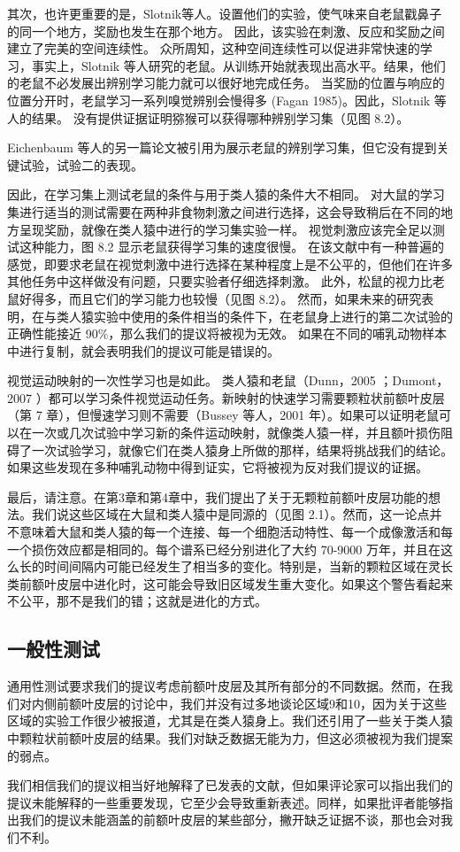其次，也许更重要的是，Slotnik等人。设置他们的实验，使气味来自老鼠戳鼻子的同一个地方，奖励也发生在那个地方。
因此，该实验在刺激、反应和奖励之间建立了完美的空间连续性。
众所周知，这种空间连续性可以促进非常快速的学习\cite{cowey1968varying}，事实上，Slotnik 等人研究的老鼠。从训练开始就表现出高水平。结果，他们的老鼠不必发展出辨别学习能力就可以很好地完成任务。
当奖励的位置与响应的位置分开时，老鼠学习一系列嗅觉辨别会慢得多 (Fagan 1985)。因此，Slotnik 等人的结果。
没有提供证据证明猕猴可以获得哪种辨别学习集（见图 8.2）。
\par


Eichenbaum 等人的另一篇论文\cite{eichenbaum1986normal}被引用为展示老鼠的辨别学习集，但它没有提到关键试验，试验二的表现。
\par


因此，在学习集上测试老鼠的条件与用于类人猿的条件大不相同。
对大鼠的学习集进行适当的测试需要在两种非食物刺激之间进行选择，这会导致稍后在不同的地方呈现奖励，就像在类人猿中进行的学习集实验一样。
视觉刺激应该完全足以测试这种能力，图 8.2 显示老鼠获得学习集的速度很慢。
在该文献中有一种普遍的感觉，即要求老鼠在视觉刺激中进行选择在某种程度上是不公平的，但他们在许多其他任务中这样做没有问题，只要实验者仔细选择刺激\cite{bussey2008touchscreen}。
此外，松鼠的视力比老鼠好得多，而且它们的学习能力也较慢（见图 8.2）。
然而，如果未来的研究表明，在与类人猿实验中使用的条件相当的条件下，在老鼠身上进行的第二次试验的正确性能接近 90$\%$，那么我们的提议将被视为无效。
如果在不同的哺乳动物样本中进行复制，就会表明我们的提议可能是错误的。
\par


视觉运动映射的一次性学习也是如此。
类人猿和老鼠（Dunn，2005 ；Dumont，2007 ）都可以学习条件视觉运动任务。新映射的快速学习需要颗粒状前额叶皮层（第 7 章），但慢速学习则不需要（Bussey 等人，2001 年）。如果可以证明老鼠可以在一次或几次试验中学习新的条件运动映射，就像类人猿一样，并且额叶损伤阻碍了一次试验学习，就像它们在类人猿身上所做的那样，结果将挑战我们的结论。如果这些发现在多种哺乳动物中得到证实，它将被视为反对我们提议的证据。
\par 
最后，请注意。在第3章和第4章中，我们提出了关于无颗粒前额叶皮层功能的想法。我们说这些区域在大鼠和类人猿中是同源的（见图 2.1）。然而，这一论点并不意味着大鼠和类人猿的每一个连接、每一个细胞活动特性、每一个成像激活和每一个损伤效应都是相同的。每个谱系已经分别进化了大约 70-9000 万年，并且在这么长的时间间隔内可能已经发生了相当多的变化。特别是，当新的颗粒区域在灵长类前额叶皮层中进化时，这可能会导致旧区域发生重大变化。如果这个警告看起来不公平，那不是我们的错；这就是进化的方式。
\subsection{一般性测试}
通用性测试要求我们的提议考虑前额叶皮层及其所有部分的不同数据。然而，在我们对内侧前额叶皮层的讨论中，我们并没有过多地谈论区域9和10，因为关于这些区域的实验工作很少被报道，尤其是在类人猿身上。我们还引用了一些关于类人猿中颗粒状前额叶皮层的结果。我们对缺乏数据无能为力，但这必须被视为我们提案的弱点。
\par 
我们相信我们的提议相当好地解释了已发表的文献，但如果评论家可以指出我们的提议未能解释的一些重要发现，它至少会导致重新表述。同样，如果批评者能够指出我们的提议未能涵盖的前额叶皮层的某些部分，撇开缺乏证据不谈，那也会对我们不利。
